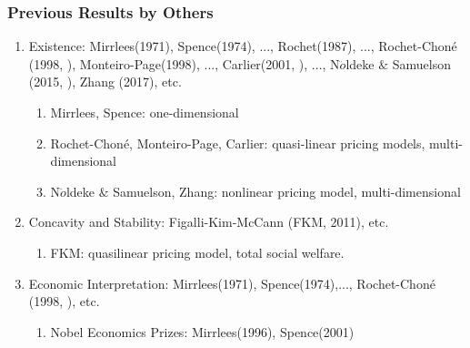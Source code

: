 \documentclass[]{beamer}
\theoremstyle{plain}
\theoremstyle{plain} %
\theoremstyle{definition}
\theoremstyle{remark}
\begin{document}
	\frame
	{
		\frametitle{Previous Results by Others}
		\begin{enumerate}[\topsep=0ex]
			\item Existence: Mirrlees(1971), Spence(1974), ...,  Rochet(1987), ..., Rochet-Chon\'{e} (1998, \cite{rochet1998ironing}), Monteiro-Page(1998), ...,  Carlier(2001, \cite{carlier2001}), ..., N$\ddot{o}$ldeke $\&$ Samuelson (2015, \cite{noldeke2015implementation}), Zhang (2017), etc.
			\begin{enumerate}[\topsep=0ex]
				\item<1-> Mirrlees, Spence:  one-dimensional 
				\item<1-> Rochet-Chon\'e, Monteiro-Page, Carlier: quasi-linear pricing models, multi-dimensional
				\item<1-> N$\ddot{o}$ldeke $\&$ Samuelson, Zhang: nonlinear pricing model, multi-dimensional
			\end{enumerate}
%
			\item Concavity and Stability: Figalli-Kim-McCann (FKM, 2011), etc.
			\begin{enumerate}[\topsep=0ex]
				\item<1-> FKM: quasilinear pricing model, total social welfare.
			\end{enumerate}
			\item Economic Interpretation: Mirrlees(1971), Spence(1974),..., Rochet-Chon\'{e} (1998, \cite{rochet1998ironing}), etc.
			\begin{enumerate}[\topsep=0ex]
				\item<1-> Nobel Economics Prizes: Mirrlees(1996), Spence(2001) %
			\end{enumerate}
		\end{enumerate}
	}
	
	
\end{document}
